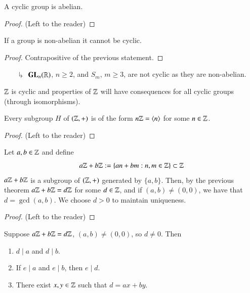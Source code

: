 \documentclass[12pt, a4paper, oneside, openright, titlepage]{book}
\begin{document}
\begin{rmk}
    A cyclic group is abelian.
    \begin{proof}
        (Left to the reader)
    \end{proof}
\end{rmk}

\begin{cor}
    If a group is non-abelian it cannot be cyclic.
    \begin{proof}
        Contrapositive of the previous statement.
    \end{proof}
\end{cor}
\begin{enumerate}
    \item[$\drsh$] $\mathbf{GL}_n(\mathbb R)$, $n \geq 2$, and $S_m$, $m \geq 3$, are not cyclic as they are non-abelian. 
\end{enumerate}


$\mathbb Z$ is cyclic and properties of $\mathbb Z$ will have consequences for all cyclic groups (through isomorphisms).

\begin{thm}
    Every subgroup $H$ of $(\mathbb Z,+)$ is of the form $n\mathbb Z = \langle n \rangle$ for some $n \in \mathbb Z$.
    \begin{proof}
        (Left to the reader)
    \end{proof}
\end{thm}

\begin{cor}[GCD]
    Let $a,b \in \mathbb Z$ and define \begin{equation}
        a\mathbb Z + b\mathbb Z := \{an + bm: n,m \in \mathbb Z\} \subset \mathbb Z
    \end{equation}
    $a\mathbb Z+b\mathbb Z$ is a subgroup of $(\mathbb Z,+)$ generated by $\{a,b\}$. Then, by the previous theorem $a\mathbb Z + b\mathbb Z = d\mathbb Z$ for some $d \in \mathbb Z$, and if $(a,b) \neq (0,0)$, we have that $d = \gcd(a,b)$. We choose $d > 0$ to maintain uniqueness.
    \begin{proof}
        (Left to the reader)
    \end{proof}
\end{cor}

\begin{cor}
    Suppose $a\mathbb Z + b\mathbb Z = d\mathbb Z$, $(a,b) \neq (0,0)$, so $d \neq 0$. Then \begin{enumerate}
        \item $d\;\vert\;a$ and $d\;\vert\;b$.
        \item If $e \;\vert\;a$ and $e\;\vert\;b$, then $e \;\vert\;d$.
        \item There exist $x,y \in \mathbb Z$ such that $d = ax + by$.
    \end{enumerate}
\end{cor}
\end{document}
